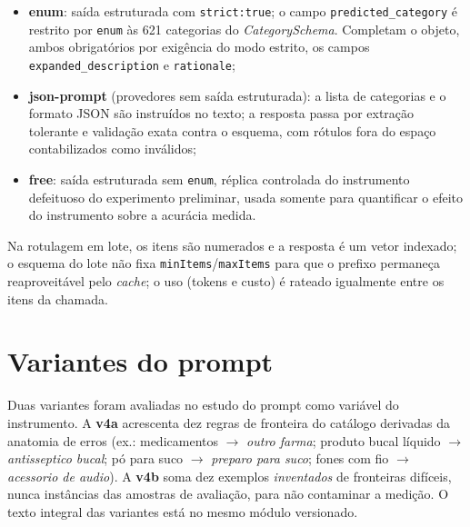 \begin{itemize}
  \item \textbf{enum}: saída estruturada com \texttt{strict:true}; o campo
  \texttt{predicted\_category} é restrito por \texttt{enum} às 621
  categorias do \textit{CategorySchema}. Completam o objeto, ambos
  obrigatórios por exigência do modo estrito, os campos
  \texttt{expanded\_description} e \texttt{rationale};
  \item \textbf{json-prompt} (provedores sem saída estruturada): a lista de
  categorias e o formato JSON são instruídos no texto; a resposta passa por
  extração tolerante e validação exata contra o esquema, com rótulos fora
  do espaço contabilizados como inválidos;
  \item \textbf{free}: saída estruturada sem \texttt{enum}, réplica
  controlada do instrumento defeituoso do experimento preliminar, usada
  somente para quantificar o efeito do instrumento sobre a acurácia
  medida.
\end{itemize}

Na rotulagem em lote, os itens são numerados e a resposta é um vetor
indexado; o esquema do lote não fixa \texttt{minItems}/\texttt{maxItems}
para que o prefixo permaneça reaproveitável pelo \textit{cache}; o uso (tokens e custo) é
rateado igualmente entre os itens da chamada.

\section{Variantes do prompt}

Duas variantes foram avaliadas no estudo do prompt como variável do
instrumento. A \textbf{v4a} acrescenta dez regras de fronteira do catálogo
derivadas da anatomia de erros (ex.: medicamentos $\to$ \textit{outro
farma}; produto bucal líquido $\to$ \textit{antisseptico bucal}; pó para
suco $\to$ \textit{preparo para suco}; fones com fio $\to$
\textit{acessorio de audio}). A \textbf{v4b} soma dez exemplos
\emph{inventados} de fronteiras difíceis, nunca instâncias das amostras de
avaliação, para não contaminar a medição. O texto integral das variantes
está no mesmo módulo versionado.
